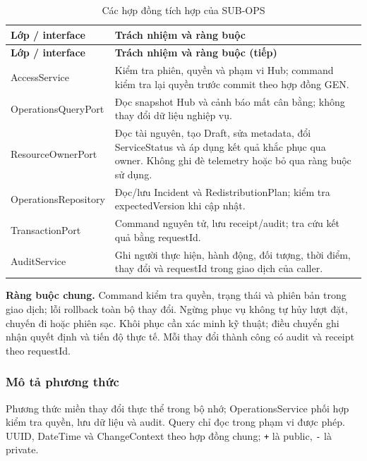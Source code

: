 \begin{longtable}{|L{37mm}|L{102mm}|}
\caption{Các hợp đồng tích hợp của SUB-OPS}\\\hline
\textbf{Lớp / interface} & \textbf{Trách nhiệm và ràng buộc}\\\hline
\endfirsthead
\hline\textbf{Lớp / interface} & \textbf{Trách nhiệm và ràng buộc (tiếp)}\\\hline\endhead
AccessService & Kiểm tra phiên, quyền và phạm vi Hub; command kiểm tra lại quyền trước commit theo hợp đồng GEN.\\\hline
Operations\allowbreak QueryPort & Đọc snapshot Hub và cảnh báo mất cân bằng; không thay đổi dữ liệu nghiệp vụ.\\\hline
ResourceOwner\allowbreak Port & Đọc tài nguyên, tạo Draft, sửa metadata, đổi ServiceStatus và áp dụng kết quả khắc phục qua owner. Không ghi đè telemetry hoặc bỏ qua ràng buộc sử dụng.\\\hline
Operations\allowbreak Repository & Đọc/lưu Incident và RedistributionPlan; kiểm tra expectedVersion khi cập nhật.\\\hline
TransactionPort & Command nguyên tử, lưu receipt/audit; tra cứu kết quả bằng requestId.\\\hline
AuditService & Ghi người thực hiện, hành động, đối tượng, thời điểm, thay đổi và requestId trong giao dịch của caller.\\\hline
\end{longtable}

\textbf{Ràng buộc chung.} Command kiểm tra quyền, trạng thái và phiên bản trong giao dịch; lỗi rollback toàn bộ thay đổi. Ngừng phục vụ không tự hủy lượt đặt, chuyến đi hoặc phiên sạc. Khôi phục cần xác minh kỹ thuật; điều chuyển ghi nhận quyết định và tiến độ thực tế. Mỗi thay đổi thành công có audit và receipt theo requestId.

\subsubsection{Mô tả phương thức}
Phương thức miền thay đổi thực thể trong bộ nhớ; OperationsService phối hợp kiểm tra quyền, lưu dữ liệu và audit. Query chỉ đọc trong phạm vi được phép. UUID, DateTime và ChangeContext theo hợp đồng chung; \texttt{+} là public, \texttt{-} là private.

